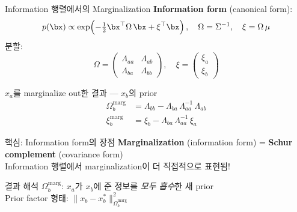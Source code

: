 \begin{frame}[shrink=20]{Information 행렬에서의 Marginalization}
  \textbf{Information form} (canonical form):
  \[
    p(\bx) \propto \exp\!\left(-\tfrac{1}{2}\bx^\top\Omega\,\bx + \xi^\top\bx\right),
    \quad
    \Omega = \Sigma^{-1},\quad \xi = \Omega\,\mu
  \]
  분할:
  \[
    \Omega = \begin{pmatrix}\Lambda_{aa} & \Lambda_{ab} \\ \Lambda_{ba} & \Lambda_{bb}\end{pmatrix},
    \quad
    \xi = \begin{pmatrix}\xi_a \\ \xi_b\end{pmatrix}
  \]
  \pause
  \begin{block}{$x_a$를 marginalize out한 결과 — $x_b$의 prior}
    \begin{align*}
      \Omega_{b}^{\mathrm{marg}} &= \Lambda_{bb} - \Lambda_{ba}\,\Lambda_{aa}^{-1}\,\Lambda_{ab} \\
      \xi_{b}^{\mathrm{marg}}    &= \xi_b - \Lambda_{ba}\,\Lambda_{aa}^{-1}\,\xi_a
    \end{align*}
  \end{block}
  \pause
  \begin{alertblock}{핵심: Information form의 장점}
    \textbf{Marginalization} (information form) = \textbf{Schur complement} (covariance form)\\
    Information 행렬에서 marginalization이 더 직접적으로 표현됨!
  \end{alertblock}
  \pause
  \begin{exampleblock}{결과 해석}
    $\Omega_b^{\mathrm{marg}}$: $x_a$가 $x_b$에 준 정보를 \emph{모두 흡수}한 새 prior\\
    Prior factor 형태: $\|x_b - x_b^*\|_{\Omega_b^{\mathrm{marg}}}^2$
  \end{exampleblock}
\end{frame}

